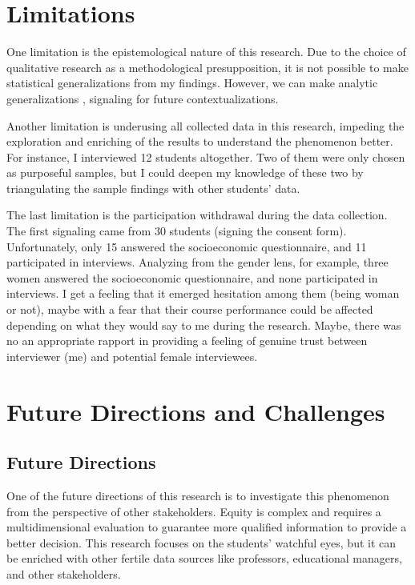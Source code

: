  \section{Limitations}
 \label{conclusions-sec:limitations}

One limitation is the epistemological nature of this research. Due to the choice of qualitative research as a methodological presupposition, it is not possible to make statistical generalizations from my findings. However, we can make analytic generalizations \cite{kennedy:1979}, signaling for future contextualizations.

Another limitation is underusing all collected data in this research, impeding the exploration and enriching of the results to understand the phenomenon better. For instance, I interviewed 12 students altogether. Two of them were only chosen as purposeful samples, but I could deepen my knowledge of these two by triangulating the sample findings with other students' data.

The last limitation is the participation withdrawal during the data collection. The first signaling came from 30 students (signing the consent form). Unfortunately, only 15 answered the socioeconomic questionnaire, and 11 participated in interviews. Analyzing from the gender lens, for example, three women answered the socioeconomic questionnaire, and none participated in interviews. I get a feeling that it emerged hesitation among them (being woman or not), maybe with a fear that their course performance could be affected depending on what they would say to me during the research. Maybe, there was no an appropriate rapport \cite{thwaites:2017} in providing a feeling of genuine trust between interviewer (me)
and potential female interviewees.

 \section{Future Directions and Challenges}
 \label{conclusions-sec:challenges}
 
\subsection{Future Directions}

One of the future directions of this research is to investigate this phenomenon from the perspective of other stakeholders. Equity is complex and requires a multidimensional evaluation to guarantee more qualified information to provide a better decision. This research focuses on the students' watchful eyes, but it can be enriched with other fertile data sources like professors, educational managers, and other stakeholders.

